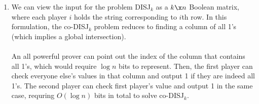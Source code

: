 \documentclass{article}
\begin{document}
\begin{enumerate}
\begin{enumerate}
        \item We can view the input for the problem DISJ$_k$ as a $k \x n$
            Boolean matrix, where each player $i$ holds the string
            corresponding to $i$th row. In this formulation, the co-DISJ$_k$
            problem reduces to finding a column of all 1's (which implies
            a global intersection).
            \\\\
            An all powerful prover can point out the index of the column that
            contains all 1's, which would require $\log n$ bits to represent.
            Then, the first player can check everyone else's values in that
            column and output 1 if they are indeed all 1's. The second player
            can check first player's value and output 1 in the same case,
            requring $O(\log n)$ bits in total to solve co-DISJ$_k$.
    \end{enumerate}

\end{enumerate}
\end{document}
